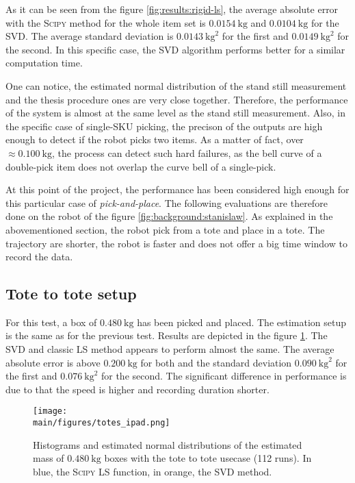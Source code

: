 \documentclass[/home/francois/latex/report/main.tex]{subfiles}
\begin{document}
As it can be seen from the figure \ref{fig:results:rigid-ls}, the average absolute error with the \textsc{Scipy} method for the whole item set is $0.0154 \ \si{\kilogram}$ and $0.0104 \ \si{\kilogram}$ for the \ac{SVD}. The average standard deviation is $0.0143 \ \si{\kilogram\squared}$ for the first and $0.0149 \ \si{\kilogram\squared}$ for the second. In this specific case, the \ac{SVD} algorithm performs better for a similar computation time.

One can notice, the estimated normal distribution of the stand still measurement and the thesis procedure ones are very close together. Therefore, the performance of the system is almost at the same level as the stand still measurement. Also, in the specific case of single-\ac{SKU} picking, the precison of the outputs are high enough to detect if the robot picks two items. As a matter of fact, over $\approx 0.100 \ \si{\kilogram}$, the process can detect such hard failures, as the bell curve of a double-pick item does not overlap the curve bell of a single-pick.

At this point of the project, the performance has been considered high enough for this particular case of \textit{pick-and-place}. The following evaluations are therefore done on the robot of the figure \ref{fig:background:stanislaw}. As explained in the abovementioned section, the robot pick from a tote and place in a tote. The trajectory are shorter, the robot is faster and does not offer a big time window to record the data.

\subsection{Tote to tote setup}

For this test, a box of $0.480 \ \si{\kilogram}$ has been picked and placed. The estimation setup is the same as for the previous test. Results are depicted in the figure \ref{fig:results:rigid-ls-tote}. The \ac{SVD} and classic \ac{LS} method appears to perform almost the same. The average absolute error is above $0.200 \ \si{\kilogram}$ for both and the standard deviation $0.090 \ \si{\kilogram\squared}$ for the first and $0.076 \ \si{\kilogram\squared}$ for the second. The significant difference in performance is due to that the speed is higher and recording duration shorter.

\begin{figure}[h]
  \centering
  \texttt{[image: \\main/figures/totes\_ipad.png]}
  \caption{Histograms and estimated normal distributions of the estimated mass of $0.480 \ \si{\kilogram}$ boxes with the tote to tote usecase (112 runs). In blue, the \textsc{Scipy} \ac{LS} function, in orange, the \ac{SVD} method.}
  \label{fig:results:rigid-ls-tote}
\end{figure}
\end{document}
